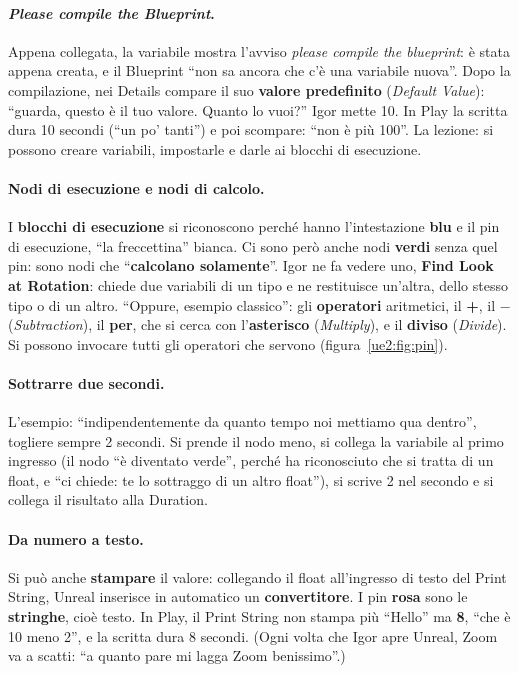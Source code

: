 \paragraph{\emph{Please compile the Blueprint}.} Appena collegata, la variabile mostra
l'avviso \emph{please compile the blueprint}: è stata appena creata, e il Blueprint ``non
sa ancora che c'è una variabile nuova''. Dopo la compilazione, nei Details compare il
suo \textbf{valore predefinito} (\emph{Default Value}): ``guarda, questo è il tuo valore.
Quanto lo vuoi?'' Igor mette 10. In Play la scritta dura 10 secondi (``un po' tanti'') e
poi scompare: ``non è più 100''. La lezione: si possono creare variabili, impostarle e
darle ai blocchi di esecuzione.

\paragraph{Nodi di esecuzione e nodi di calcolo.} I \textbf{blocchi di esecuzione} si
riconoscono perché hanno l'intestazione \textbf{blu} e il pin di esecuzione, ``la
freccettina'' bianca. Ci sono però anche nodi \textbf{verdi} senza quel pin: sono nodi
che ``\textbf{calcolano solamente}''. Igor ne fa vedere uno, \textbf{Find Look at
Rotation}: chiede due variabili di un tipo e ne restituisce un'altra, dello stesso tipo
o di un altro. ``Oppure, esempio classico'': gli \textbf{operatori} aritmetici, il
\textbf{+}, il \textbf{$-$} (\emph{Subtraction}), il \textbf{per}, che si cerca con
l'\textbf{asterisco} (\emph{Multiply}), e il \textbf{diviso} (\emph{Divide}). Si
possono invocare tutti gli operatori che servono (figura~\ref{ue2:fig:pin}).

\paragraph{Sottrarre due secondi.} L'esempio: ``indipendentemente da quanto tempo noi
mettiamo qua dentro'', togliere sempre 2 secondi. Si prende il nodo meno, si collega la
variabile al primo ingresso (il nodo ``è diventato verde'', perché ha riconosciuto che si
tratta di un float, e ``ci chiede: te lo sottraggo di un altro float''), si scrive 2 nel
secondo e si collega il risultato alla Duration.

\paragraph{Da numero a testo.} Si può anche \textbf{stampare} il valore: collegando il
float all'ingresso di testo del Print String, Unreal inserisce in automatico un
\textbf{convertitore}. I pin \textbf{rosa} sono le \textbf{stringhe}, cioè testo. In
Play, il Print String non stampa più ``Hello'' ma \textbf{8}, ``che è 10 meno 2'', e la
scritta dura 8 secondi. (Ogni volta che Igor apre Unreal, Zoom va a scatti: ``a quanto
pare mi lagga Zoom benissimo''.)

